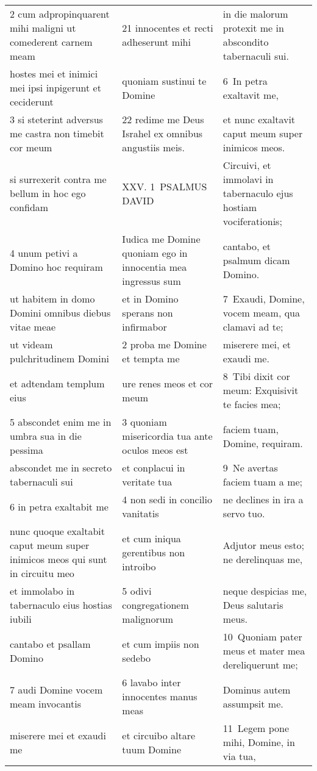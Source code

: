 \documentclass{article}
\begin{document}
\begin{longtable}{@{}p{}p{}p{}@{}}
2 cum adpropinquarent mihi maligni ut comederent carnem meam	&	21 innocentes et recti adheserunt mihi	&	in die malorum protexit me in abscondito tabernaculi sui.	\\
hostes mei et inimici mei ipsi inpigerunt et ceciderunt	&	quoniam sustinui te Domine	&	6 In petra exaltavit me,	\\
3 si steterint adversus me castra non timebit cor meum	&	22 redime me Deus Israhel ex omnibus angustiis meis.	&	et nunc exaltavit caput meum super inimicos meos.	\\
si surrexerit contra me bellum in hoc ego confidam	&	XXV. 1 PSALMUS DAVID	&	Circuivi, et immolavi in tabernaculo ejus hostiam vociferationis;	\\
4 unum petivi a Domino hoc requiram	&	Iudica me Domine quoniam ego in innocentia mea ingressus sum	&	cantabo, et psalmum dicam Domino.	\\
ut habitem in domo Domini omnibus diebus vitae meae	&	et in Domino sperans non infirmabor	&	7 Exaudi, Domine, vocem meam, qua clamavi ad te;	\\
ut videam pulchritudinem Domini	&	2 proba me Domine et tempta me	&	miserere mei, et exaudi me.	\\
et adtendam templum eius	&	ure renes meos et cor meum	&	8 Tibi dixit cor meum: Exquisivit te facies mea;	\\
5 abscondet enim me in umbra sua in die pessima	&	3 quoniam misericordia tua ante oculos meos est	&	faciem tuam, Domine, requiram.	\\
abscondet me in secreto tabernaculi sui	&	et conplacui in veritate tua	&	9 Ne avertas faciem tuam a me;	\\
6 in petra exaltabit me	&	4 non sedi in concilio vanitatis	&	ne declines in ira a servo tuo.	\\
nunc quoque exaltabit caput meum super inimicos meos qui sunt in circuitu meo	&	et cum iniqua gerentibus non introibo	&	Adjutor meus esto; ne derelinquas me,	\\
et immolabo in tabernaculo eius hostias iubili	&	5 odivi congregationem malignorum	&	neque despicias me, Deus salutaris meus.	\\
cantabo et psallam Domino	&	et cum impiis non sedebo	&	10 Quoniam pater meus et mater mea dereliquerunt me;	\\
7 audi Domine vocem meam invocantis	&	6 lavabo inter innocentes manus meas	&	Dominus autem assumpsit me.	\\
miserere mei et exaudi me	&	et circuibo altare tuum Domine	&	11 Legem pone mihi, Domine, in via tua,	\\

\end{longtable}
\end{document}
